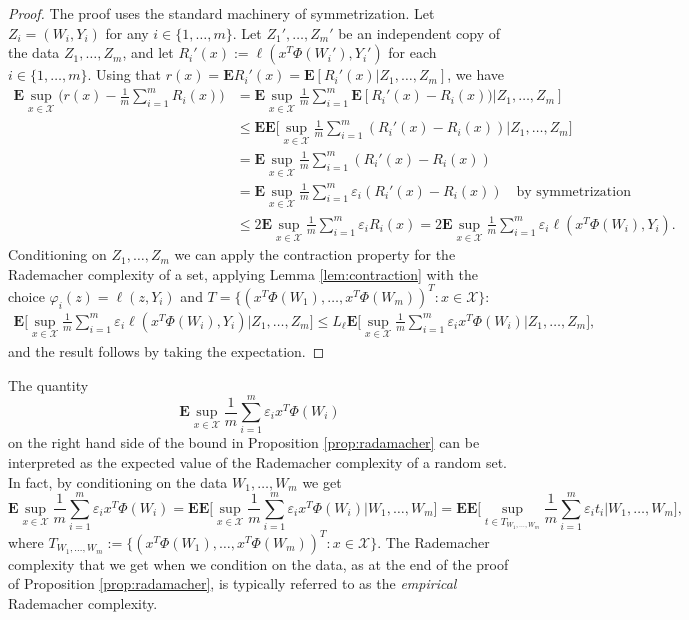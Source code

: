 \begin{proof}
The proof uses the standard machinery of symmetrization. Let $Z_i=(W_i,Y_i)$ for any $i\in\{1,\ldots,m\}$. Let $Z_1',\ldots,Z_m'$ be an independent copy of the data $Z_1,\ldots,Z_m$, and let $R_i'(x) := \ell(x^T\Phi(W_i'),Y_i')$ for each $i\in\{1,\ldots,m\}$. Using that $r(x)=\mathbf{E}R_i'(x)=\mathbf{E}[R_i'(x)|Z_1,\ldots,Z_m]$, we have
\begin{align*}
	\mathbf{E}\sup_{x\in\mathcal{X}} \bigg( r(x) - \frac{1}{m}\sum_{i=1}^m R_i(x) \bigg)
	&=
	\mathbf{E}\sup_{x\in\mathcal{X}} \frac{1}{m}\sum_{i=1}^m \mathbf{E} [ R_i'(x) - R_i(x) ) | Z_1,\ldots,Z_m]\\
	&\le
	\mathbf{E}\mathbf{E}\bigg[\sup_{x\in\mathcal{X}} \frac{1}{m}\sum_{i=1}^m ( R_i'(x) - R_i(x)) \bigg| Z_1,\ldots,Z_m\bigg]\\
	&=
	\mathbf{E}\sup_{x\in\mathcal{X}} \frac{1}{m}\sum_{i=1}^m ( R_i'(x) - R_i(x) )\\
	&=
	\mathbf{E}\sup_{x\in\mathcal{X}} \frac{1}{m}\sum_{i=1}^m \varepsilon_i (R_i'(x) - R_i(x)) \quad \text{by symmetrization}\\
	&\le
	2\mathbf{E}\sup_{x\in\mathcal{X}} \frac{1}{m}\sum_{i=1}^m \varepsilon_i R_i(x)
	= 2\mathbf{E} \sup_{x\in\mathcal{X}} \frac{1}{m}\sum_{i=1}^m\varepsilon_i \ell(x^T\Phi(W_i),Y_i).
\end{align*}
Conditioning on $Z_1,\ldots,Z_m$ we can apply the contraction property for the Rademacher complexity of a set,
applying Lemma \ref{lem:contraction} with the choice $\varphi_i(z)=\ell(z,Y_i)$ and $T=\{(x^T\Phi(W_1),\ldots,x^T\Phi(W_m))^T : x\in\mathcal{X}\}$:
\begin{align}
	\mathbf{E} \bigg[ \sup_{x\in\mathcal{X}} \frac{1}{m}\sum_{i=1}^m\varepsilon_i \ell(x^T\Phi(W_i),Y_i) \bigg| Z_1,\ldots,Z_m \bigg]
	\le
	L_\ell\mathbf{E} \bigg[ \sup_{x\in\mathcal{X}} \frac{1}{m}\sum_{i=1}^m\varepsilon_i x^T\Phi(W_i) \bigg| Z_1,\ldots,Z_m \bigg],
	\label{boundEmpiricalRad}
\end{align}
and the result follows by taking the expectation.
\end{proof}

\begin{remark}
\label{rem:empiricalRad}
The quantity
$$
	\mathbf{E} \sup_{x\in\mathcal{X}} \frac{1}{m}\sum_{i=1}^m\varepsilon_i x^T\Phi(W_i)
$$
on the right hand side of the bound in Proposition \ref{prop:radamacher} can be interpreted as the expected value of the Rademacher complexity of a random set. In fact, by conditioning on the data $W_1,\ldots,W_m$ we get
$$
	\mathbf{E} \sup_{x\in\mathcal{X}} \frac{1}{m}\sum_{i=1}^m\varepsilon_i x^T\Phi(W_i)
	=
	\mathbf{E}
	\mathbf{E} \bigg[\sup_{x\in\mathcal{X}} \frac{1}{m}\sum_{i=1}^m\varepsilon_i x^T\Phi(W_i) \bigg| W_1,\ldots,W_m\bigg]
	=
	\mathbf{E}
	\mathbf{E} \bigg[\sup_{t\in T_{W_1,\ldots,W_m}} \frac{1}{m}\sum_{i=1}^m\varepsilon_i t_i \bigg| W_1,\ldots,W_m\bigg],
$$
where
$
	T_{W_1,\ldots,W_m}
	:= \{ (x^T\Phi(W_1),\ldots,x^T\Phi(W_m))^T : x\in\mathcal{X} \}.
$
The Rademacher complexity that we get when we condition on the data, as at the end of the proof of Proposition \ref{prop:radamacher}, is typically referred to as the \emph{empirical} Rademacher complexity.
\end{remark}

